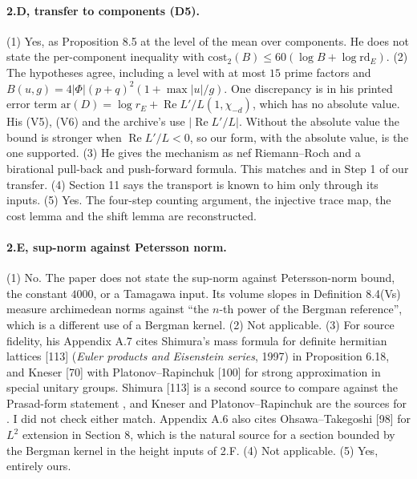\documentclass[11pt]{article}
\theoremstyle{remark}
\begin{document}
\paragraph{2.D, transfer to components (D5).} (1) Yes, as Proposition 8.5 at the level of the mean over components. He does not state the per-component inequality with $\mathrm{cost}_2(B)\le60(\log B+\log\mathrm{rd}_E)$. (2) The hypotheses agree, including a level with at most $15$ prime factors and $B(u,g)=4\lvert\Phi\rvert(p+q)^2(1+\max\lvert u\rvert/g)$. One discrepancy is in his printed error term $\mathrm{ar}(D)=\log r_E+\operatorname{Re}L'/L(1,\chi_{-d})$, which has no absolute value. His (V5), (V6) and the archive's  use $\lvert\operatorname{Re}L'/L\rvert$. Without the absolute value the bound is stronger when $\operatorname{Re}L'/L<0$, so our form, with the absolute value, is the one supported. (3) He gives the mechanism as nef Riemann--Roch and a birational pull-back and push-forward formula. This matches  and  in Step 1 of our transfer. (4) Section 11 says the transport is known to him only through its inputs. (5) Yes. The four-step counting argument, the injective trace map, the cost lemma and the shift lemma are reconstructed.

\paragraph{2.E, sup-norm against Petersson norm.} (1) No. The paper does not state the sup-norm against Petersson-norm bound, the constant $4000$, or a Tamagawa input. Its volume slopes in Definition 8.4(Vs) measure archimedean norms against ``the $n$-th power of the Bergman reference'', which is a different use of a Bergman kernel. (2) Not applicable. (3) For source fidelity, his Appendix A.7 cites Shimura's mass formula for definite hermitian lattices [113] (\emph{Euler products and Eisenstein series}, 1997) in Proposition 6.18, and Kneser [70] with Platonov--Rapinchuk [100] for strong approximation in special unitary groups. Shimura [113] is a second source to compare against the Prasad-form statement , and Kneser and Platonov--Rapinchuk are the sources for . I did not check either match. Appendix A.6 also cites Ohsawa--Takegoshi [98] for $L^2$ extension in Section 8, which is the natural source for a section bounded by the Bergman kernel in the height inputs of 2.F. (4) Not applicable. (5) Yes, entirely ours.
\end{document}
